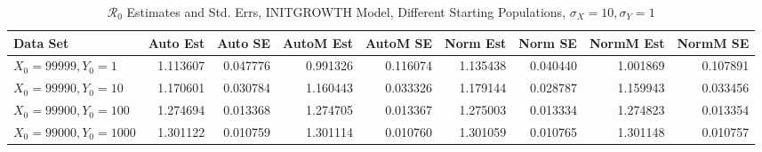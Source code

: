 \documentclass[12pt]{article}
\newcommand{\rr}{\ensuremath{\mathcal{R}_0}}
\begin{document}
\begin{table}[H]
	
	\caption{$\rr$ Estimates and Std. Errs, INITGROWTH Model,
		Different Starting Populations, 
		$\sigma_X = 10, \sigma_Y = 1$}
	\begin{footnotesize}
		\hskip -1.7cm
		\begin{tabular}{l|r|r|r|r|r|r|r|r}
			\hline
			Data Set & Auto Est & Auto SE & AutoM Est & AutoM SE & Norm Est & Norm SE & NormM Est & NormM SE\\
			\hline
			$X_0 = 99999, Y_0 = 1$ & 1.113607 & 0.047776 & 0.991326 & 0.116074 & 1.135438 & 0.040440 & 1.001869 & 0.107891\\
			\hline
			$X_0 = 99990, Y_0 = 10$ & 1.170601 & 0.030784 & 1.160443 & 0.033326 & 1.179144 & 0.028787 & 1.159943 & 0.033456\\
			\hline
			$X_0 = 99900, Y_0 = 100$ & 1.274694 & 0.013368 & 1.274705 & 0.013367 & 1.275003 & 0.013334 & 1.274823 & 0.013354\\
			\hline
			$X_0 = 99000, Y_0 = 1000$ & 1.301122 & 0.010759 & 1.301114 & 0.010760 & 1.301059 & 0.010765 & 1.301148 & 0.010757\\
			\hline
		\end{tabular}
	\end{footnotesize}
\end{table}
\end{document}
